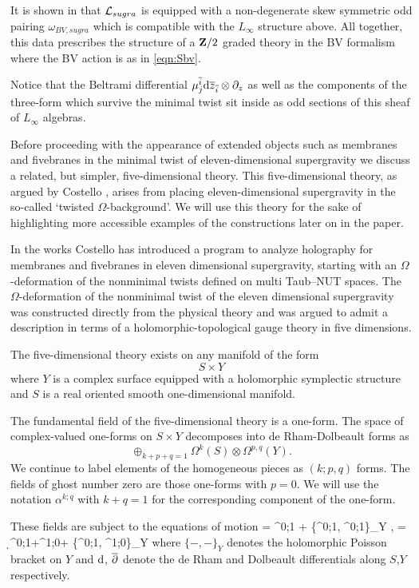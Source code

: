 \documentclass[11pt]{amsart}%
\begin{document}
It is shown in \cite{RSW} that $\mathcal L_{sugra}$ is equipped with a non-degenerate skew symmetric odd pairing $\omega_{BV,sugra}$ which is compatible with the $L_\infty$ structure above. 
All together, this data prescribes the structure of a $\mathbf{Z}/2$ graded theory in the BV formalism where the BV action is as in \eqref{eqn:Sbv}.

Notice that the Beltrami differential $\mu^{\overline{i}}_j {\rm d} \overline{z}_{\overline{i}} \otimes \partial_z$ as well as the components of the three-form which survive the minimal twist sit inside as odd sections of this sheaf of $L_\infty$ algebras.

\parsec[s:twistedsugra]

Before proceeding with the appearance of extended objects such as membranes and fivebranes in the minimal twist of eleven-dimensional supergravity we discuss a related, but simpler, five-dimensional theory.
This five-dimensional theory, as argued by Costello \cite{CostelloM5}, arises from placing eleven-dimensional supergravity in the so-called `twisted $\Omega$-background'.
We will use this theory for the sake of highlighting more accessible examples of the constructions later on in the paper. 

In the works \cite{CostelloM5,CostelloM2} Costello has introduced a program to analyze holography for membranes and fivebranes in eleven dimensional supergravity, starting with an $\Omega$-deformation of the nonminimal twists defined on multi Taub--NUT spaces.
The $\Omega$-deformation of the nonminimal twist of the eleven dimensional supergravity was constructed directly from the physical theory and was argued to admit a description in terms of a holomorphic-topological gauge theory in five dimensions.

The five-dimensional theory exists on any manifold of the form
\[
  S\times Y
\]
where $Y$ is a complex surface equipped with a holomorphic symplectic structure and $S$ is a real oriented smooth one-dimensional manifold.

The fundamental field of the five-dimensional theory is a one-form. 
The space of complex-valued one-forms on $S\times Y$ decomposes into de Rham-Dolbeault forms as
\[
\oplus_{k+p+q=1}\Omega^{k}(S)\otimes \Omega^{p,q}(Y).
\]
We continue to label elements of the homogeneous pieces as $(k;p,q)$ forms. 
The fields of ghost number zero are those one-forms with $p=0$. 
We will use the notation $\alpha^{k;q}$ with $k+q=1$ for the corresponding component of the one-form.

These fields are subject to the equations of motion
 = \dbar \alpha^{0;1} + \{\alpha^{0;1}, \alpha^{0;1}\}_Y ,  = \d \alpha^{0;1}+\dbar \alpha^{1;0}+ \{\alpha^{0;1}, \alpha^{1;0}\}_Y
\eeqn
where $\{-,-\}_{Y}$ denotes the holomorphic Poisson bracket on $Y$ and ${\rm d}$, $\overline{\partial}$ denote the de Rham and Dolbeault differentials along $S$,$Y$ respectively.
\end{document}
